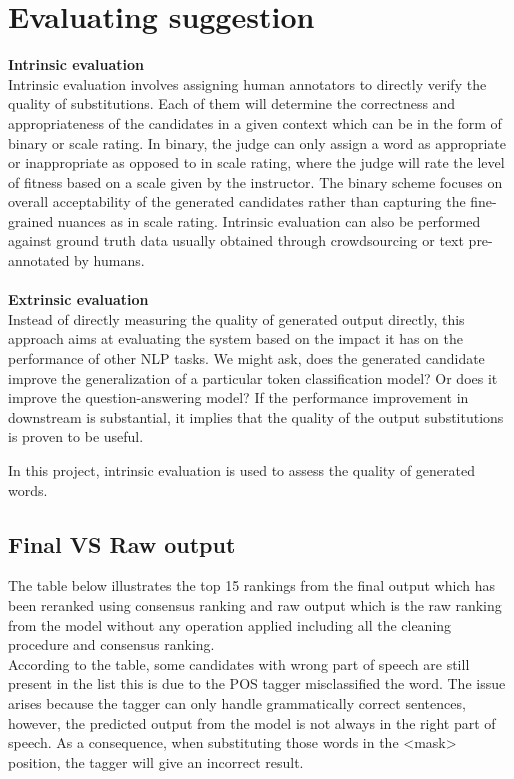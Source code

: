 \documentclass[12pt,oneside,openright,a4paper]{cpe-english-project}
\begin{document}
\section {Evaluating suggestion}

\textbf{Intrinsic evaluation}\\
Intrinsic evaluation involves assigning human annotators to directly verify the quality of substitutions.
Each of them will determine the correctness and appropriateness of the candidates in a given context which can be in the form of binary or scale rating. In binary, the judge can only assign a word as appropriate or inappropriate as opposed to in scale rating, where the judge will rate the level of fitness based on a scale given by the instructor.
The binary scheme focuses on overall acceptability of the generated candidates rather than capturing the fine-grained nuances as in scale rating. Intrinsic evaluation can also be performed against ground truth data usually obtained through crowdsourcing or text pre-annotated by humans.
\\\\
\textbf{Extrinsic evaluation}\\
Instead of directly measuring the quality of generated output directly, this approach aims at evaluating the system based on the impact it has on the performance of other NLP tasks. We might ask, does the generated candidate improve the generalization of a particular token classification model? Or does it improve the question-answering model? If the performance improvement in downstream is substantial, it implies that the quality of the output substitutions is proven to be useful\cite{r}. 

In this project, intrinsic evaluation is used to assess the quality of generated words.

\subsection{Final VS Raw output}
The table below illustrates the top 15 rankings from the final output which has been reranked using consensus ranking and raw output which is the raw ranking from the model without any operation applied including all the cleaning procedure and consensus ranking.
\\
According to the table, some candidates with wrong part of speech are still present in the list this is due to the POS tagger misclassified the word. The issue arises because the tagger can only handle grammatically correct sentences, however, the predicted output from the model is not always in the right part of speech. As a consequence, when substituting those words in the <mask> position, the tagger will give an incorrect result. 
\\\\
\end{document}
